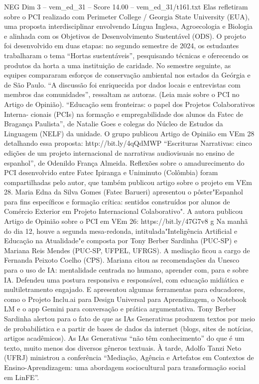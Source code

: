 \begin{textsample}{NEG Dim 3 – vem\_ed\_31 – Score 14.00 – vem\_ed\_31/t161.txt}
Elas refletiram sobre o PCI realizado com Perimeter College / Georgia State University (EUA), uma proposta interdisciplinar envolvendo Língua Inglesa, Agroecologia e Biologia e alinhada com os Objetivos de Desenvolvimento Sustentável (ODS).
O projeto foi desenvolvido em duas etapas: no segundo semestre de 2024, os estudantes trabalharam o tema “Hortas sustentáveis”, pesquisando técnicas e oferecendo os produtos da horta a uma instituição de caridade.
No semestre seguinte, as equipes compararam esforços de conservação ambiental nos estados da Geórgia e de São Paulo. “A discussão foi enriquecida por dados locais e entrevistas com membros das comunidades”, ressaltam as autoras. (Leia mais sobre o PCI no Artigo de Opinião). “Educação sem fronteiras: o papel dos Projetos Colaborativos Interna- cionais (PCIs) na formação e empregabilidade dos alunos da Fatec de Bragança Paulista”, de Natalie Goes e colegas do Núcleo de Estudos da Linguagem (NELF) da unidade.
O grupo publicou Artigo de Opinião em VEm 28 detalhando essa proposta: http://bit.ly/4qQdMWP “Escrituras Narrativas: cinco edições de um projeto internacional de narrativas audiovisuais no ensino de espanhol”, de Odenildo França Almeida.
Reflexões sobre o amadurecimento do PCI desenvolvido entre Fatec Ipiranga e Uniminuto (Colômbia) foram compartilhadas pelo autor, que também publicou artigo sobre o projeto em VEm 28.
Maria Edna da Silva Gomes (Fatec Barueri) apresentou o pôster"Espanhol para fins específicos e formação crítica: sentidos construídos por alunos de Comércio Exterior em Projeto Internacional Colaborativo".
A autora publicou Artigo de Opinião sobre o PCI em VEm 26: https://bit.ly/47G7v8 g Na manhã do dia 12, houve a segunda mesa-redonda, intitulada"Inteligência Artificial e Educação na Atualidade"e composta por Tony Berber Sardinha (PUC-SP) e Mariana Reis Mendes (PUC-SP, UFPEL, UFRGS).
A mediação ficou a cargo de Fernanda Peixoto Coelho (CPS).
Mariana citou as recomendações da Unesco para o uso de IA: mentalidade centrada no humano, aprender com, para e sobre IA.
Defendeu uma postura responsiva e responsável, com educação midiática e multiletramento engajado.
E apresentou algumas ferramentas para educadores, como o Projeto Inclu.ai para Design Universal para Aprendizagem, o Notebook LM e o app Gemini para conversação e prática argumentativa.
Tony Berber Sardinha alertou para o fato de que as IAs Generativas produzem textos por meio de probabilística e a partir de bases de dados da internet (blogs, sites de notícias, artigos acadêmicos).
As IAs Generativas “não têm conhecimento” do que é um texto, muito menos dos diversos gêneros textuais. À tarde, Adolfo Tanzi Neto (UFRJ) ministrou a conferência “Mediação, Agência e Artefatos em Contextos de Ensino-Aprendizagem: uma abordagem sociocultural para transformação social em LinFE”.

\end{textsample}
